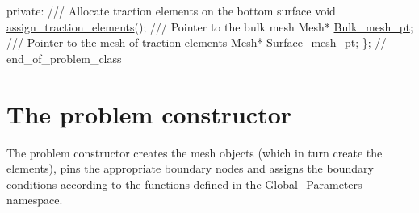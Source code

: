 \begin{DoxyCodeInclude}
\textcolor{keyword}{private}:
 \textcolor{comment}{}
\textcolor{comment}{ /// Allocate traction elements on the bottom surface}
\textcolor{comment}{} \textcolor{keywordtype}{void} \hyperlink{classAxisymmetricLinearElasticityProblem_ab0cfde2632d6711b75744bcc2644ae04}{assign\_traction\_elements}();
 \textcolor{comment}{}
\textcolor{comment}{ /// Pointer to the bulk mesh}
\textcolor{comment}{} Mesh* \hyperlink{classAxisymmetricLinearElasticityProblem_a49f2e786217cf28ebed1d828a4b06147}{Bulk\_mesh\_pt};
 \textcolor{comment}{}
\textcolor{comment}{ /// Pointer to the mesh of traction elements}
\textcolor{comment}{} Mesh* \hyperlink{classAxisymmetricLinearElasticityProblem_a62a8248651ee5b17b5168fe9158039dc}{Surface\_mesh\_pt};
\}; \textcolor{comment}{// end\_of\_problem\_class}

\end{DoxyCodeInclude}




 

\hypertarget{index_constructor}{}\section{The problem constructor}\label{index_constructor}
The problem constructor creates the mesh objects (which in turn create the elements), pins the appropriate boundary nodes and assigns the boundary conditions according to the functions defined in the {\ttfamily \hyperlink{namespaceGlobal__Parameters}{Global\+\_\+\+Parameters}} namespace.


